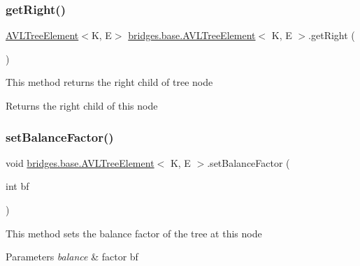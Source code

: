\subsubsection{\texorpdfstring{get\+Right()}{getRight()}}
{\footnotesize\ttfamily \hyperlink{classbridges_1_1base_1_1_a_v_l_tree_element}{A\+V\+L\+Tree\+Element}$<$K, E$>$ \hyperlink{classbridges_1_1base_1_1_a_v_l_tree_element}{bridges.\+base.\+A\+V\+L\+Tree\+Element}$<$ K, E $>$.get\+Right (\begin{DoxyParamCaption}{ }\end{DoxyParamCaption})}

This method returns the right child of tree node

\begin{DoxyReturn}{Returns}
the right child of this node 
\end{DoxyReturn}
\hypertarget{classbridges_1_1base_1_1_a_v_l_tree_element_a0dc3c83e750cc39535afb08ea92f6c98}{}\label{classbridges_1_1base_1_1_a_v_l_tree_element_a0dc3c83e750cc39535afb08ea92f6c98} 
\subsubsection{\texorpdfstring{set\+Balance\+Factor()}{setBalanceFactor()}}
{\footnotesize\ttfamily void \hyperlink{classbridges_1_1base_1_1_a_v_l_tree_element}{bridges.\+base.\+A\+V\+L\+Tree\+Element}$<$ K, E $>$.set\+Balance\+Factor (\begin{DoxyParamCaption}\item[{int}]{bf }\end{DoxyParamCaption})}

This method sets the balance factor of the tree at this node


\begin{DoxyParams}{Parameters}
{\em balance} & factor bf \\
\hline
\end{DoxyParams}
\hypertarget{classbridges_1_1base_1_1_a_v_l_tree_element_ac42b744989ed7e18dcbd52980e674b33}{}\label{classbridges_1_1base_1_1_a_v_l_tree_element_ac42b744989ed7e18dcbd52980e674b33} 
